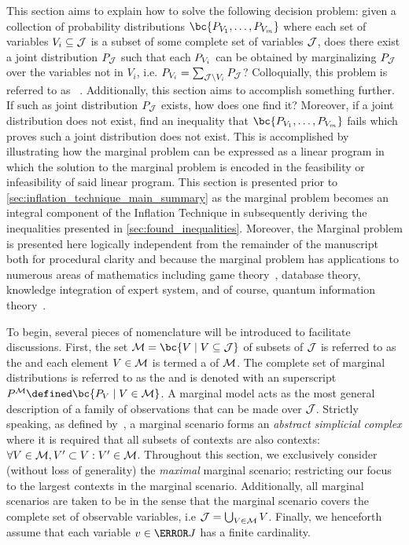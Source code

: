 \documentclass[aps, 10pt, english, twoside, pra, nofootinbib, tightenlines, longbibliography, superscriptaddress]{revtex4-1}
\begin{document}
    This section aims to explain how to solve the following decision problem: given a collection of probability distributions $\bc{\prob[V_1], \ldots, \prob[V_m]}$ where each set of variables $V_{i} \subseteq \mathcal{J}$ is a subset of some complete set of variables $\mathcal{J}$, does there exist a joint distribution $\prob[\jointvar]$ such that each $\prob[V_i]$ can be obtained by marginalizing $\prob[\jointvar]$ over the variables not in $V_i$, i.e. $\prob[V_i] = \sum_{\jointvar \setminus V_i} \prob[\jointvar]$? Colloquially, this problem is referred to as ~\cite{Fritz_2011}. Additionally, this section aims to accomplish something further. If such as joint distribution $\prob[\jointvar]$ exists, how does one find it? Moreover, if a joint distribution does not exist, find an inequality that $\bc{\prob[V_1], \ldots, \prob[V_m]}$ fails which proves such a joint distribution does not exist. This is accomplished by illustrating how the marginal problem can be expressed as a linear program in which the solution to the marginal problem is encoded in the feasibility or infeasibility of said linear program. This section is presented prior to \cref{sec:inflation_technique_main_summary} as the marginal problem becomes an integral component of the Inflation Technique in subsequently deriving the inequalities presented in \cref{sec:found_inequalities}. Moreover, the Marginal problem is presented here logically independent from the remainder of the manuscript both for procedural clarity and because the marginal problem has applications to numerous areas of mathematics including game theory~\cite{Vorobev_1962}, database theory, knowledge integration of expert system, and of course, quantum information theory~\cite{Fritz_2011}.

    To begin, several pieces of nomenclature will be introduced to facilitate discussions. First, the set $\mscenario = \bc{V \mid V \subseteq \jointvar}$ of subsets of $\mathcal{J}$ is referred to as the  and each element $V \in \mathcal{M}$ is termed a  of $\mathcal{M}$. The complete set of marginal distributions is referred to as the  and is denoted with an superscript $\prob^{\mscenario} \defined \bc{\prob[V] \mid V \in \mscenario}$. A marginal model acts as the most general description of a family of observations that can be made over $\mathcal{J}$. Strictly speaking, as defined by~\cite{Fritz_2011}, a marginal scenario forms an \textit{abstract simplicial complex} where it is required that all subsets of contexts are also contexts: $\forall V \in \mathcal{M}, V' \subset V : V' \in \mathcal{M}$. Throughout this section, we exclusively consider (without loss of generality) the \textit{maximal} marginal scenario; restricting our focus to the largest contexts in the marginal scenario. Additionally, all marginal scenarios are taken to be  in the sense that the marginal scenario covers the complete set of observable variables, i.e $\mathcal{J} = \bigcup_{V \in \mathcal{M}} V$. Finally, we henceforth assume that each variable $v \in \s J$ has a finite cardinality.
\end{document}

